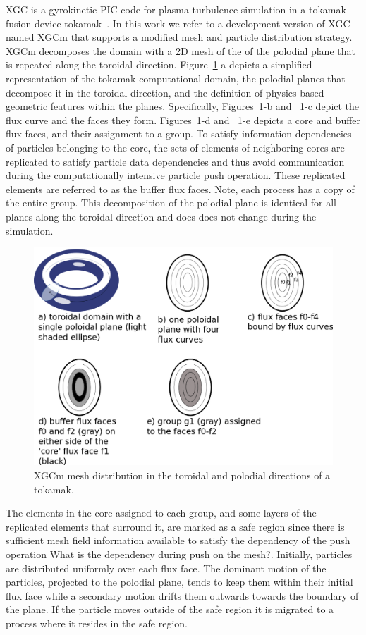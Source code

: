 \documentclass[conference]{IEEEtran}
\begin{document}
XGC is a gyrokinetic PIC code for plasma turbulence simulation in a tokamak
fusion device tokamak~\cite{chang2004numerical,Ku2016467,ku2009}.
In this work we refer to a development version of XGC named XGCm that supports
a modified mesh and particle distribution strategy.
XGCm decomposes the domain with a 2D mesh of the
of the polodial plane that is repeated along the toroidal direction.
Figure~\ref{fig:xgcmPtn}-a depicts a simplified representation of the tokamak computational
domain, the polodial planes that decompose it in the toroidal direction, and the
definition of physics-based geometric features within the planes.
Specifically, Figures~\ref{fig:xgcmPtn}-b and ~\ref{fig:xgcmPtn}-c depict the
flux curve and the faces they form.
Figures~\ref{fig:xgcmPtn}-d and ~\ref{fig:xgcmPtn}-e depicts a core and buffer
flux faces, and their assignment to a group.
To satisfy information dependencies of particles belonging to the core,
the sets of elements of neighboring cores are replicated to satisfy
particle data dependencies and thus avoid communication during the
computationally intensive particle push operation.
These replicated elements are referred to as the buffer flux faces.
Note, each process has a copy of the entire group.
This decomposition of the polodial plane is identical for all planes along the
toroidal direction and does does not change during the simulation.

\begin{figure}[!ht]
  \centering
  \includegraphics[width=.4\textwidth]{../figures/xgcm_partition.png}
  \caption{XGCm mesh distribution in the toroidal and polodial directions of a tokamak.}
  \label{fig:xgcmPtn}
\end{figure}

The elements in the core assigned to each group, and some layers of the
replicated elements that surround it, are marked as a safe region since there is
sufficient mesh field information available to satisfy the dependency of the
push operation {\color{red} What is the dependency during push on the mesh?}.
Initially, particles are distributed uniformly over each flux face.
The dominant motion of the particles, projected to the polodial plane, tends to
keep them within their initial flux face while a secondary motion drifts them
outwards towards the boundary of the plane.
If the particle moves outside of the safe region it is migrated to a process
where it resides in the safe region.
\end{document}
